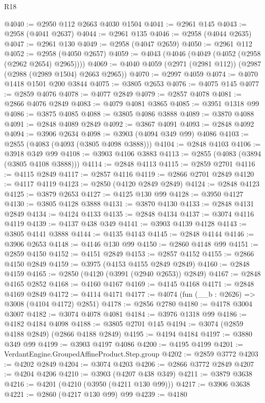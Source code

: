 \begin{lexlean}{R18}
\begin{coremodule}
@4040 := @2950 @112 @2663 @4030 @1504
@4041 := @2961 @145
@4043 := @2958 (@4041 @2637)
@4044 := @2961 @135
@4046 := @2958 (@4044 @2635)
@4047 := @2961 @130
@4049 := @2958 (@4047 @2659)
@4050 := @2961 @112
@4052 := @2958 (@4050 @2657)
@4059 := @4043 (@4046 (@4049 (@4052 (@2958 (@2962 @2654) @2965))))
@4069 := @4040 @4059 (@2971 (@2981 @112)) (@2987 (@2988 (@2989 @1504) @2663 @2965))
@4070 := @2997 @4059
@4074 := @4070 @1418 @1501 @200 @3844
@4075 := @3805 @2653
@4076 := @4075 @145
@4077 := @2859 @4076
@4078 := @4077 @2849
@4079 := @2857 @4078
@4081 := @2866 @4076 @2849
@4083 := @4079 @4081 @3865
@4085 := @3951 @1318 @99
@4086 := @3875 @4085
@4088 := @3805 @4086 @3888
@4089 := @3870 @4088
@4091 := @2848 @4089 @2849
@4092 := @3867 @4091
@4093 := @2848 @4092
@4094 := @3906 @2634
@4098 := @3903 (@4094 @349 @99) @4086
@4103 := @2855 (@4083 (@4093 (@3805 @4098 @3888)))
@4104 := @2848 @4103
@4106 := @3918 @349 @99
@4108 := @3903 @4106 @3883
@4113 := @2855 (@4083 (@3894 (@3805 @4108 @3888)))
@4114 := @2848 @4113
@4115 := @2859 @2701
@4116 := @4115 @2849
@4117 := @2857 @4116
@4119 := @2866 @2701 @2849
@4120 := @4117 @4119
@4123 := @2850 (@4120 @2849 @2849)
@4124 := @2848 @4123
@4125 := @3879 @2653
@4127 := @4125 @130 @99
@4128 := @3950 @4127
@4130 := @3805 @4128 @3888
@4131 := @3870 @4130
@4133 := @2848 @4131 @2849
@4134 := @4124 @4133
@4135 := @2848 @4134
@4137 := @3074 @4116 @4119
@4139 := @4137 @438 @349
@4141 := @3903 @4139 @4128
@4143 := @3805 @4141 @3888
@4144 := @4135 @4143
@4145 := @2848 @4144
@4146 := @3906 @2653
@4148 := @4146 @130 @99
@4150 := @2860 @4148 @99
@4151 := @2859 @4150
@4152 := @4151 @2849
@4153 := @2857 @4152
@4155 := @2866 @4150 @2849
@4159 := @3975 (@4153 @4155 @2849 @2849)
@4160 := @2848 @4159
@4165 := @2850 (@4120 (@3991 (@2940 @2653)) @2849)
@4167 := @2848 @4165 @2852
@4168 := @4160 @4167
@4169 := @4145 @4168
@4171 := @2848 @4169 @2849
@4172 := @4114 @4171
@4177 := @4074 (fun (__b : @2626) => @3008 (@4104 @4172) @2851)
@4178 := @2856 @2780
@4180 := @4178 @3004 @3007
@4182 := @3074 @4078 @4081
@4184 := @3976 @1318 @99
@4186 := @4182 @4184 @4098
@4188 := @3805 @2701 @145
@4194 := @3074 (@2859 @4188 @2849) (@2866 @4188 @2849)
@4195 := @4194 @4184
@4197 := @3880 @349 @99
@4199 := @3903 @4197 @4086
@4200 := @4195 @4199
@4201 := VerdantEngine.GroupedAffineProduct.Step.group
@4202 := @2859 @3772
@4203 := @4202 @2849
@4204 := @3074 @4203
@4206 := @2866 @3772 @2849
@4207 := @4204 @4206
@4210 := @3903 (@4207 @438 @349)
@4211 := @3879 @3638
@4216 := @4201 (@4210 (@3950 (@4211 @130 @99)))
@4217 := @3906 @3638
@4221 := @2860 (@4217 @130 @99) @99
@4239 := @4180

\end{coremodule}
\end{lexlean}
